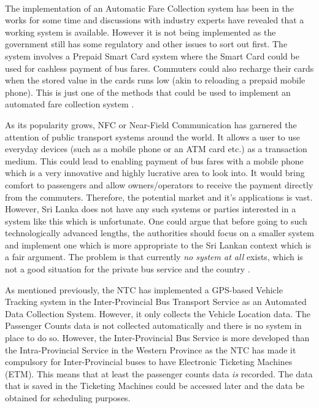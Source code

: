 \documentclass[12pt, oneside]{report}
\begin{document}
\paragraph{ } The implementation of an Automatic Fare Collection system has been in the works for some time and discussions with industry experts have revealed that a working system is available. However it is not being implemented as the government still has some regulatory and other issues to sort out first. The system involves a Prepaid Smart Card system where the Smart Card could be used for cashless payment of bus fares. Commuters could also recharge their cards when the stored value in the cards runs low (akin to reloading a prepaid mobile phone). This is just one of the methods that could be used to implement an automated fare collection system \citep{Wilson2009, Silva2010}.

As its popularity grows, NFC or Near-Field Communication has garnered the attention of public transport systems around the world. It allows a user to use everyday devices (such as a mobile phone or an ATM card etc.) as a transaction medium. This could lead to enabling payment of bus fares with a mobile phone which is a very innovative and highly lucrative area to look into. It would bring comfort to passengers and allow owners/operators to receive the payment directly from the commuters. Therefore, the potential market and it's applications is vast. However, Sri Lanka does not have any such systems or parties interested in a system like this which is unfortunate. One could argue that before going to such technologically advanced lengths, the authorities should focus on a smaller system and implement one which is more appropriate to the Sri Lankan context which is a fair argument. The problem is that currently \textit{no system at all} exists, which is not a good situation for the private bus service and the country \citep{Silva2010, Sinha2012}.

As mentioned previously, the NTC has implemented a GPS-based Vehicle Tracking system in the Inter-Provincial Bus Transport Service as an Automated Data Collection System. However, it only collects the Vehicle Location data. The Passenger Counts data is not collected automatically and there is no system in place to do so. However, the Inter-Provincial Bus Service is more developed than the Intra-Provincial Service in the Western Province as the NTC has made it compulsory for Inter-Provincial buses to have Electronic Ticketing Machines (ETM). This means that at least the passenger counts data \textit{is} recorded. The data that is saved in the Ticketing Machines could be accessed later and the data be obtained for scheduling purposes.
\end{document}
